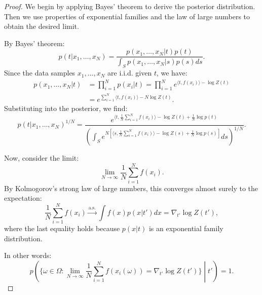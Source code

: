 \documentclass{article}
\theoremstyle{plain}
\theoremstyle{definition}
\theoremstyle{remark}
\begin{document}
\begin{proof}
We begin by applying Bayes' theorem to derive the posterior distribution. Then we use properties of exponential families and the law of large numbers to obtain the desired limit.

By Bayes' theorem:
\begin{equation}
p(t|x_1, \ldots, x_N) = \frac{p(x_1, \ldots, x_N|t)p(t)}{\int_S p(x_1, \ldots, x_N|s)p(s)ds}.
\end{equation}
Since the data samples $x_1, \ldots, x_N$ are i.i.d. given $t$, we have:
\begin{equation}
\begin{split}
p(x_1, \ldots, x_N|t) &= \prod_{i=1}^N p(x_i|t) = \prod_{i=1}^N e^{\langle t, f(x_i) \rangle - \log Z(t)} \\ &= e^{\sum_{i=1}^N \langle t, f(x_i) \rangle - N \log Z(t)}.
\end{split}
\end{equation}
Substituting into the posterior, we find:
\begin{equation}
p(t|x_1, \ldots, x_N)^{1/N} = \frac{e^{\langle t, \frac{1}{N} \sum_{i=1}^N f(x_i) \rangle - \log Z(t) + \frac{1}{N} \log p(t)}}{\left(\int_S e^{N\left[\langle s, \frac{1}{N} \sum_{i=1}^N f(x_i) \rangle - \log Z(s) + \frac{1}{N}\log p(s) \right]} ds \right)^{1/N}}.
\end{equation}

Now, consider the limit:
\begin{equation}
\lim_{N \to \infty} \frac{1}{N} \sum_{i=1}^N f(x_i).
\end{equation}
By Kolmogorov's strong law of large numbers, this converges almost surely to the expectation:
\begin{equation}
\frac{1}{N} \sum_{i=1}^N f(x_i) \xrightarrow{\text{a.s.}} \int f(x) p(x|t') dx = \nabla_{t'} \log Z(t'),
\end{equation}
where the last equality holds because $p(x|t)$ is an exponential family distribution.

In other words:
\begin{equation}
p\left(\{\omega \in \Omega : \lim_{N \to \infty} \frac{1}{N} \sum_{i=1}^N f(x_i(\omega)) = \nabla_{t'} \log Z(t')\} \middle| t' \right) = 1.
\end{equation}


\end{proof}
\end{document}
